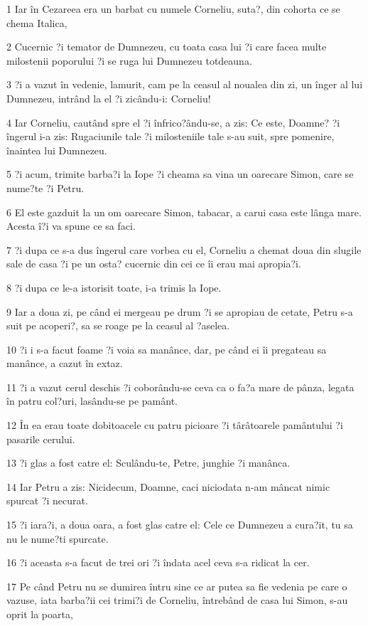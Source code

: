 \par 1 Iar în Cezareea era un barbat cu numele Corneliu, suta?, din cohorta ce se chema Italica,
\par 2 Cucernic ?i temator de Dumnezeu, cu toata casa lui ?i care facea multe milostenii poporului ?i se ruga lui Dumnezeu totdeauna.
\par 3 ?i a vazut în vedenie, lamurit, cam pe la ceasul al noualea din zi, un înger al lui Dumnezeu, intrând la el ?i zicându-i: Corneliu!
\par 4 Iar Corneliu, cautând spre el ?i înfrico?ându-se, a zis: Ce este, Doamne? ?i îngerul i-a zis: Rugaciunile tale ?i milosteniile tale s-au suit, spre pomenire, înaintea lui Dumnezeu.
\par 5 ?i acum, trimite barba?i la Iope ?i cheama sa vina un oarecare Simon, care se nume?te ?i Petru.
\par 6 El este gazduit la un om oarecare Simon, tabacar, a carui casa este lânga mare. Acesta î?i va spune ce sa faci.
\par 7 ?i dupa ce s-a dus îngerul care vorbea cu el, Corneliu a chemat doua din slugile sale de casa ?i pe un osta? cucernic din cei ce îi erau mai apropia?i.
\par 8 ?i dupa ce le-a istorisit toate, i-a trimis la Iope.
\par 9 Iar a doua zi, pe când ei mergeau pe drum ?i se apropiau de cetate, Petru s-a suit pe acoperi?, sa se roage pe la ceasul al ?aselea.
\par 10 ?i i s-a facut foame ?i voia sa manânce, dar, pe când ei îi pregateau sa manânce, a cazut în extaz.
\par 11 ?i a vazut cerul deschis ?i coborându-se ceva ca o fa?a mare de pânza, legata în patru col?uri, lasându-se pe pamânt.
\par 12 În ea erau toate dobitoacele cu patru picioare ?i târâtoarele pamântului ?i pasarile cerului.
\par 13 ?i glas a fost catre el: Sculându-te, Petre, junghie ?i manânca.
\par 14 Iar Petru a zis: Nicidecum, Doamne, caci niciodata n-am mâncat nimic spurcat ?i necurat.
\par 15 ?i iara?i, a doua oara, a fost glas catre el: Cele ce Dumnezeu a cura?it, tu sa nu le nume?ti spurcate.
\par 16 ?i aceasta s-a facut de trei ori ?i îndata acel ceva s-a ridicat la cer.
\par 17 Pe când Petru nu se dumirea întru sine ce ar putea sa fie vedenia pe care o vazuse, iata barba?ii cei trimi?i de Corneliu, întrebând de casa lui Simon, s-au oprit la poarta,
